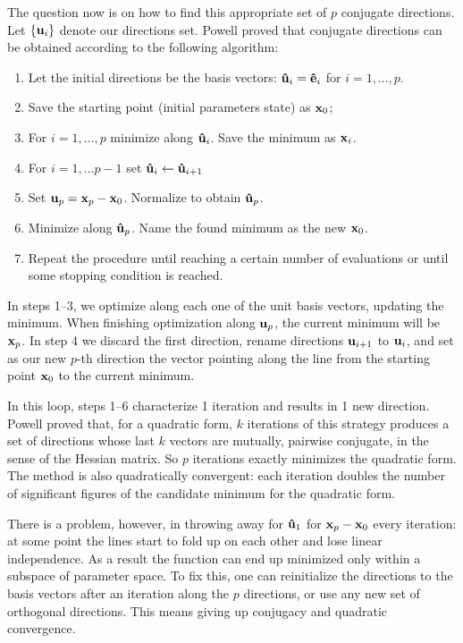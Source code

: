 The question now is on how to find this appropriate set of $p$ conjugate directions. Let $\{\vb{u}_i\}$ denote our directions set. Powell \cite{powell_efficient_1964} proved that conjugate directions can be obtained according to the following algorithm:
\begin{enumerate}
    \item Let the initial directions be the basis vectors: $\vu{u}_i=\vu{e}_i$ for $i=1,\dots, p$.
    \item Save the starting point (initial parameters state) as $\vb{x}_0$;
    \item For $i=1,\dots, p$ minimize along $\vu{u}_i$. Save the minimum as $\vb{x}_i$.
    \item For $i=1,\dots p-1$ set $\vu{u}_i\leftarrow\vu{u}_{i+1}$
    \item Set $\vb{u}_p=\vb{x}_p - \vb{x}_0$. Normalize to obtain $\vu{u}_p$.
    \item Minimize along $\vu{u}_p$. Name the found minimum as the new $\vb{x}_0$.
    \item Repeat the procedure until reaching a certain number of evaluations or until some stopping condition is reached.
\end{enumerate}

In steps 1--3, we optimize along each one of the unit basis vectors, updating the minimum. When finishing optimization along $\vb{u}_p$, the current minimum will be $\vb{x}_p$. In step 4 we discard the first direction, rename directions $\vb{u}_{i+1}$ to $\vb{u}_i$, and set as our new $p$-th direction the vector pointing along the line from the starting point $\vb{x}_0$ to the current minimum.

In this loop, steps 1--6 characterize 1 iteration and results in 1 new direction. Powell proved that, for a quadratic form, $k$ iterations of this strategy produces a set of directions whose last $k$ vectors are mutually, pairwise conjugate, in the sense of the Hessian matrix. So $p$ iterations exactly minimizes the quadratic form. The method is also quadratically convergent: each iteration doubles the number of significant figures of the candidate minimum for the quadratic form.

There is a problem, however, in throwing away  for $\vu{u}_1$ for $\vb{x}_p - \vb{x}_0$ every iteration: at some point the lines start to fold up on each other and lose linear independence. As a result the function can end up minimized only within a subspace of parameter space. To fix this, one can reinitialize the directions to the basis vectors after an iteration along the $p$ directions, or use any new set of orthogonal directions. This means giving up conjugacy and quadratic convergence.

